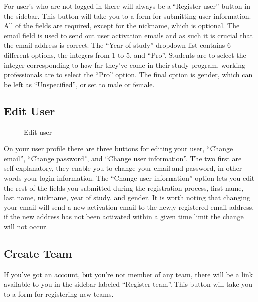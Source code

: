 For user{\textquoteright}s who are not logged in there will always be a
{\textquotedblleft}Register user{\textquotedblright} button in the
sidebar. This button will take you to a form for submitting user
information. All of the fields are required, except for the nickname,
which is optional. The email field is used to send out user activation
emails and as such it is crucial that the email address is correct. The
{\textquotedblleft}Year of study{\textquotedblright} dropdown list
contains 6 different options, the integers from 1 to 5, and
{\textquotedblleft}Pro{\textquotedblright}. Students are to select the
integer corresponding to how far they{\textquoteright}ve come in their
study program, working professionals are to select the
{\textquotedblleft}Pro{\textquotedblright} option. The final option is
gender, which can be left as
{\textquotedblleft}Unspecified{\textquotedblright}, or set to male or
female.


\subsection{Edit User}

\begin{figure}
\centering
	\caption{Edit user}
	\label{fig:editUser}
\end{figure}

On your user profile there are three buttons for editing your user,
{\textquotedblleft}Change email{\textquotedblright},
{\textquotedblleft}Change password{\textquotedblright}, and
{\textquotedblleft}Change user information{\textquotedblright}. The two
first are self-explanatory, they enable you to change your email and
password, in other words your login information. The
{\textquotedblleft}Change user information{\textquotedblright} option
lets you edit the rest of the fields you submitted during the
registration process, first name, last name, nickname, year of study,
and gender. It is worth noting that changing your email will send a new
activation email to the newly registered email address, if the new
address has not been activated within a given time limit the change
will not occur.

\subsection{Create Team}

If you{\textquoteright}ve got an account, but you{\textquoteright}re not
member of any team, there will be a link available to you in the
sidebar labeled {\textquotedblleft}Register team{\textquotedblright}.
This button will take you to a form for registering new teams. 

